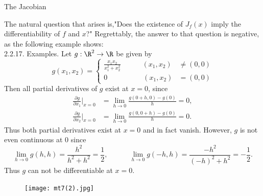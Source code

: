 \documentclass[smaller,hyperref={CJKbookmarks=true}]{beamer}
\begin{document}
\begin{frame}{The Jacobian}
\begin{spacing}{1}
The natural question that arises is,"Does the existence of $J_f(x)$ imply the dif{}ferentiability of $f$ and $x$?"
\newpage
\vspace*{3pt}
Regrettably, the answer to that question is negative, as the following
example shows:\\[6pt]
\alert{2.2.17. Examples.} Let $g:\R^2\to\R$ be given by
\[g(x_1,x_2)=\left\{\begin{aligned}
                      \frac{x_1x_2}{x_1^2+x_2^2}\qquad\quad(x_1,x_2)&\neq(0,0) \\
                      0\qquad\qquad\quad(x_1,x_2)&=(0,0)
                    \end{aligned}\right.\]
Then all partial derivatives of $g$ exist at $x=0$, since
\begin{equation*}
  \begin{aligned}
    \frac{\partial g}{\partial x_1}\Big|_{x=0}&=\lim_{h\to0}\frac{g(0+h,0)-g(0)}{h}=0,\\
    \frac{\partial g}{\partial x_2}\Big|_{x=0}&=\lim_{h\to0}\frac{g(0,0+h)-g(0)}{h}=0.
  \end{aligned}
\end{equation*}
Thus both partial derivatives exist at $x=0$ and in fact vanish.
\newpage
However, $g$ is not even continuous at $0$ since
\begin{equation*}
  \lim_{h\to0}g(h,h)=\frac{h^2}{h^2+h^2}=\frac{1}{2},\qquad\quad
  \lim_{h\to0}g(-h,h)=\frac{-h^2}{(-h)^2+h^2}=-\frac{1}{2}.
\end{equation*}
Thus $g$ can not be dif{}ferentiable at $x=0$.
\begin{figure}
  \centering
  \texttt{[image: mt7(2).jpg]}


\end{figure}
\end{spacing}
\end{frame}
\end{document}
